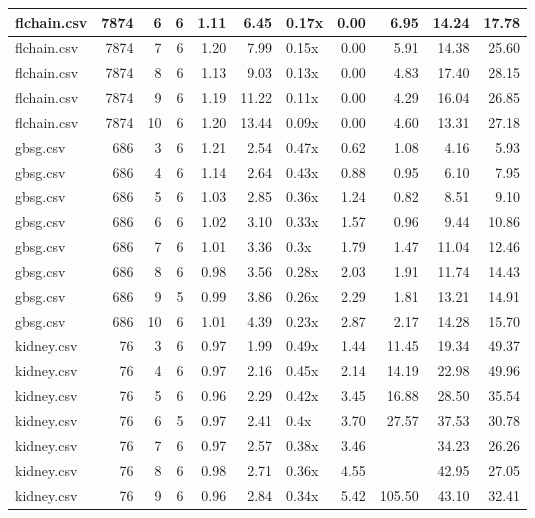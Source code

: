 \begin{table}[ht]
\begin{tabular}{lrrrrrlrrrr}
   \hline
flchain.csv & 7874 &   6 &   6 & 1.11 & 6.45 & 0.17x & 0.00 & 6.95 & 14.24 & 17.78 \\ 
   \hline
flchain.csv & 7874 &   7 &   6 & 1.20 & 7.99 & 0.15x & 0.00 & 5.91 & 14.38 & 25.60 \\ 
   \hline
flchain.csv & 7874 &   8 &   6 & 1.13 & 9.03 & 0.13x & 0.00 & 4.83 & 17.40 & 28.15 \\ 
   \hline
flchain.csv & 7874 &   9 &   6 & 1.19 & 11.22 & 0.11x & 0.00 & 4.29 & 16.04 & 26.85 \\ 
   \hline
flchain.csv & 7874 &  10 &   6 & 1.20 & 13.44 & 0.09x & 0.00 & 4.60 & 13.31 & 27.18 \\ 
   \hline
gbsg.csv & 686 &   3 &   6 & 1.21 & 2.54 & 0.47x & 0.62 & 1.08 & 4.16 & 5.93 \\ 
   \hline
gbsg.csv & 686 &   4 &   6 & 1.14 & 2.64 & 0.43x & 0.88 & 0.95 & 6.10 & 7.95 \\ 
   \hline
gbsg.csv & 686 &   5 &   6 & 1.03 & 2.85 & 0.36x & 1.24 & 0.82 & 8.51 & 9.10 \\ 
   \hline
gbsg.csv & 686 &   6 &   6 & 1.02 & 3.10 & 0.33x & 1.57 & 0.96 & 9.44 & 10.86 \\ 
   \hline
gbsg.csv & 686 &   7 &   6 & 1.01 & 3.36 & 0.3x & 1.79 & 1.47 & 11.04 & 12.46 \\ 
   \hline
gbsg.csv & 686 &   8 &   6 & 0.98 & 3.56 & 0.28x & 2.03 & 1.91 & 11.74 & 14.43 \\ 
   \hline
gbsg.csv & 686 &   9 &   5 & 0.99 & 3.86 & 0.26x & 2.29 & 1.81 & 13.21 & 14.91 \\ 
   \hline
gbsg.csv & 686 &  10 &   6 & 1.01 & 4.39 & 0.23x & 2.87 & 2.17 & 14.28 & 15.70 \\ 
   \hline
kidney.csv &  76 &   3 &   6 & 0.97 & 1.99 & 0.49x & 1.44 & 11.45 & 19.34 & 49.37 \\ 
   \hline
kidney.csv &  76 &   4 &   6 & 0.97 & 2.16 & 0.45x & 2.14 & 14.19 & 22.98 & 49.96 \\ 
   \hline
kidney.csv &  76 &   5 &   6 & 0.96 & 2.29 & 0.42x & 3.45 & 16.88 & 28.50 & 35.54 \\ 
   \hline
kidney.csv &  76 &   6 &   5 & 0.97 & 2.41 & 0.4x & 3.70 & 27.57 & 37.53 & 30.78 \\ 
   \hline
kidney.csv &  76 &   7 &   6 & 0.97 & 2.57 & 0.38x & 3.46 &  & 34.23 & 26.26 \\ 
   \hline
kidney.csv &  76 &   8 &   6 & 0.98 & 2.71 & 0.36x & 4.55 &  & 42.95 & 27.05 \\ 
   \hline
kidney.csv &  76 &   9 &   6 & 0.96 & 2.84 & 0.34x & 5.42 & 105.50 & 43.10 & 32.41 \\ 

\end{tabular}
\end{table}
